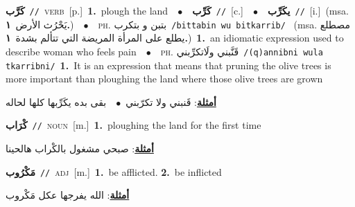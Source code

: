 \documentclass[10pt,a4paper,twoside]{article} %
\begin{document}
\begin{multicols}{2}
{\setlength\topsep{0pt}\textbf{\foreignlanguage{arabic}{كَرَّب}}\ {\color{gray}\texttt{//}\color{black}}\ \textsc{verb}\ [p.]\ \textbf{1.}~plough the land\ \ $\bullet$\ \ \setlength\topsep{0pt}\textbf{\foreignlanguage{arabic}{كَرِّب}}\ {\color{gray}\texttt{//}\color{black}}\ [c.]\ \ $\bullet$\ \ \setlength\topsep{0pt}\textbf{\foreignlanguage{arabic}{يكَرِّب}}\ {\color{gray}\texttt{//}\color{black}}\ [i.]\ \color{gray}(msa. \foreignlanguage{arabic}{يَحْرُث الأرض}~\foreignlanguage{arabic}{\textbf{١.}})\color{black}\ \ $\bullet$\ \ \textsc{ph.} \color{gray} \foreignlanguage{arabic}{بتبن و بتكرب}\color{black}\ {\color{gray}\texttt{/{\sffamily bittabin wu bitkarrib}/}\color{black}}\ \color{gray} (msa. \foreignlanguage{arabic}{مصطلع يطلع على المرأة المريضة التي تتألم بشدة}~\foreignlanguage{arabic}{\textbf{١.}})\color{black}\ \textbf{1.}~an idiomatic expression used to describe woman who feels pain\ \ $\bullet$\ \ \textsc{ph.} \color{gray} \foreignlanguage{arabic}{قَنَّبني ولَاتكرِّبني}\color{black}\ {\color{gray}\texttt{/{\sffamily (q)annibni wula tkarribni}/}\color{black}}\ \textbf{1.}~It is an expression that means that pruning the olive trees is more important than ploughing the land where those olive trees are grown\  \begin{flushright}\color{gray}\foreignlanguage{arabic}{\textbf{\underline{\foreignlanguage{arabic}{أمثلة}}}: قَنبني ولا تكرّبني\ $\bullet$\ \  بقى بده يكَرِّبها كلها لحاله}\end{flushright}\color{black}} \vspace{2mm}

{\setlength\topsep{0pt}\textbf{\foreignlanguage{arabic}{كْرَاب}}\ {\color{gray}\texttt{//}\color{black}}\ \textsc{noun}\ [m.]\ \textbf{1.}~ploughing the land for the first time\  \begin{flushright}\color{gray}\foreignlanguage{arabic}{\textbf{\underline{\foreignlanguage{arabic}{أمثلة}}}: صبحي مشغول بالكْراب هالحينا}\end{flushright}\color{black}} \vspace{2mm}

{\setlength\topsep{0pt}\textbf{\foreignlanguage{arabic}{مَكْرُوب}}\ {\color{gray}\texttt{//}\color{black}}\ \textsc{adj}\ [m.]\ \textbf{1.}~be afflicted.  \textbf{2.}~be inflicted\  \begin{flushright}\color{gray}\foreignlanguage{arabic}{\textbf{\underline{\foreignlanguage{arabic}{أمثلة}}}: الله يفرجها عكل مَكْروب}\end{flushright}\color{black}} \vspace{2mm}


\end{multicols}
\end{document}
